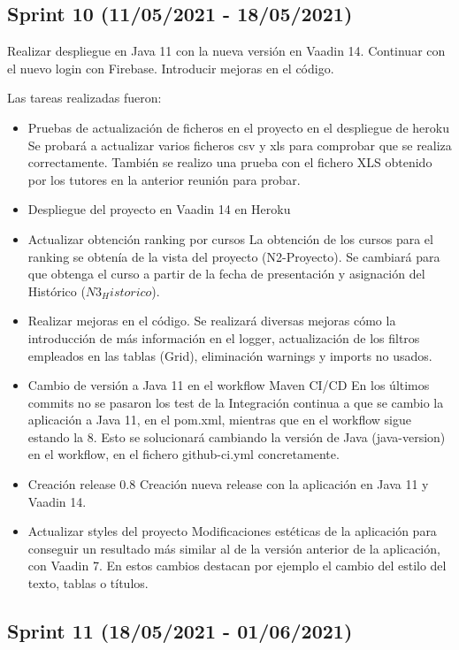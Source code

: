 \subsection{Sprint 10 (11/05/2021 - 18/05/2021)}
Realizar despliegue en Java 11 con la nueva versión en Vaadin 14. Continuar con el nuevo login con Firebase. Introducir mejoras en el código.

Las tareas realizadas fueron:
\begin{itemize}
	\tightlist
	\item Pruebas de actualización de ficheros en el proyecto en el despliegue de heroku 
	Se probará a actualizar varios ficheros csv y xls para comprobar que se realiza correctamente. También se realizo una prueba con el fichero XLS obtenido por los tutores en la anterior reunión para probar.
	\item Despliegue del proyecto en Vaadin 14 en Heroku 
	\item Actualizar obtención ranking por cursos
	La obtención de los cursos para el ranking se obtenía de la vista del proyecto (N2-Proyecto). Se cambiará para que obtenga el curso a partir de la fecha de presentación y asignación del Histórico ($N3_Historico$).
	\item Realizar mejoras en el código.
	Se realizará diversas mejoras cómo la introducción de más información en el logger, actualización de los filtros empleados en las tablas (Grid), eliminación warnings y imports no usados.
	\item Cambio de versión a Java 11 en el workflow Maven CI/CD
	En los últimos commits no se pasaron los test de la Integración continua a que se cambio la aplicación a Java 11, en el pom.xml, mientras que en el workflow sigue estando la 8. Esto se solucionará cambiando la versión de Java (java-version) en el workflow, en el fichero github-ci.yml concretamente.
	\item Creación release 0.8
	Creación nueva release con la aplicación en Java 11 y Vaadin 14.
	\item Actualizar styles del proyecto
	Modificaciones estéticas de la aplicación para conseguir un resultado más similar al de la versión anterior de la aplicación, con Vaadin 7. En estos cambios destacan por ejemplo el cambio del estilo del texto, tablas o títulos.
	
\end{itemize}

\subsection{Sprint 11 (18/05/2021 - 01/06/2021)}


